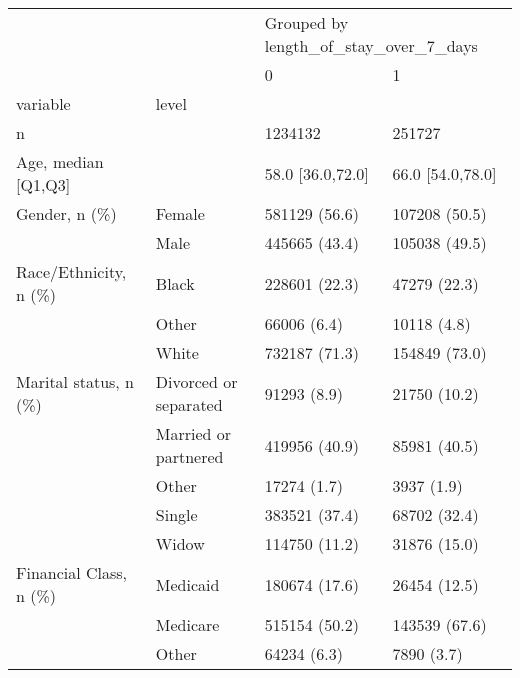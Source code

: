 \begin{tabular}{llll}
\toprule
                                       &   & \multicolumn{2}{l}{Grouped by length\_of\_stay\_over\_7\_days} \\
                                       &   &                                     0 &                 1 \\
variable & level &                                       &                   \\
\midrule
n &   &                               1234132 &            251727 \\
Age, median [Q1,Q3] &   &                      58.0 [36.0,72.0] &  66.0 [54.0,78.0] \\
Gender, n (\%) & Female &                         581129 (56.6) &     107208 (50.5) \\
                                       & Male &                         445665 (43.4) &     105038 (49.5) \\
Race/Ethnicity, n (\%) & Black &                         228601 (22.3) &      47279 (22.3) \\
                                       & Other &                           66006 (6.4) &       10118 (4.8) \\
                                       & White &                         732187 (71.3) &     154849 (73.0) \\
Marital status, n (\%) & Divorced or separated &                           91293 (8.9) &      21750 (10.2) \\
                                       & Married or partnered &                         419956 (40.9) &      85981 (40.5) \\
                                       & Other &                           17274 (1.7) &        3937 (1.9) \\
                                       & Single &                         383521 (37.4) &      68702 (32.4) \\
                                       & Widow &                         114750 (11.2) &      31876 (15.0) \\
Financial Class, n (\%) & Medicaid &                         180674 (17.6) &      26454 (12.5) \\
                                       & Medicare &                         515154 (50.2) &     143539 (67.6) \\
                                       & Other &                           64234 (6.3) &        7890 (3.7) \\

\end{tabular}
